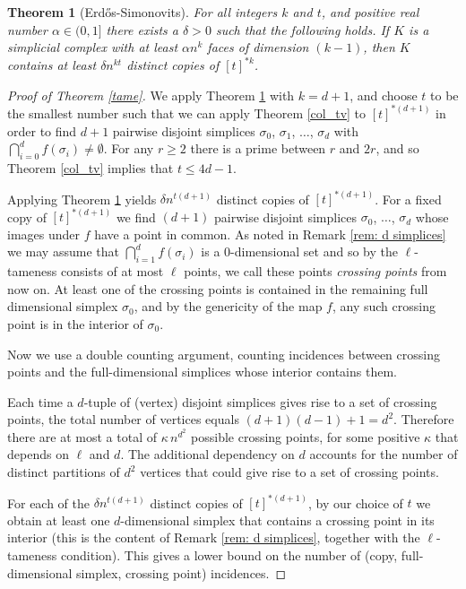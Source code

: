 \documentclass[12pt,a4paper,oneside]{amsart}\sloppy
\newtheorem{theorem}{Theorem}%
\theoremstyle{definition}
\begin{document}
\begin{theorem}[Erd\H{o}s-Simonovits]\label{ES}
For all integers $k$ and $t$, and positive real number $\alpha \in (0,1]$ there exists a $\delta>0$ such that the following holds. If $K$ is a simplicial complex with at least $\alpha n^k$ faces of dimension $(k-1)$, then $K$ contains at least $\delta n^{kt}$ distinct copies of $[t]^{*k}$.
\end{theorem}


\begin{proof}[Proof of Theorem \ref{tame}] We apply Theorem \ref{ES} with $k=d+1$, and choose $t$ to be the smallest number such that we can apply Theorem \ref{col_tv} to $[t]^{*(d+1)}$ in order to find $d+1$ pairwise disjoint simplices $\sigma_0$, $\sigma_1$, $\ldots$,  $\sigma_d$ with $\bigcap_{i=0}^{d} f(\sigma_i)\neq \emptyset$. 
For any $r\geq 2$ there is a prime between $r$ and $2r$, and so Theorem \ref{col_tv} implies that $t\leq 4d-1$.

Applying Theorem \ref{ES} yields $\delta n^{t(d+1)}$ distinct copies of $[t]^{*(d+1)}$. For a fixed copy of $[t]^{*(d+1)}$ we find $(d+1)$ pairwise disjoint simplices $\sigma_0$, $\dots$, $\sigma_{d}$ whose images under $f$ have a point in common. 
As noted in Remark \ref{rem: d simplices} we may assume that $\bigcap_{i=1}^{d} f(\sigma_i)$ is a 0-dimensional set and so by the $\ell$-tameness consists of at most $\ell$ points,  we call these points \emph{crossing points} from now on. At least one of the crossing points is contained in the remaining full dimensional simplex $\sigma_0$, and by the genericity of the map $f$, any such crossing point is in the interior of $\sigma_0$. 

Now we use a double counting argument, counting incidences between crossing points and the full-dimensional simplices whose interior contains them.

Each time a $d$-tuple of (vertex) disjoint simplices gives rise to a set of crossing points, the total number of vertices equals $(d+1)(d-1)+1 = d^2$. Therefore there are at most a total of $\kappa \, n^{d^2}$ possible crossing points, for some positive $\kappa$ that depends on $\ell$ and $d$. The additional dependency on $d$ accounts for the number of distinct partitions of $d^2$ vertices that could give rise to a set of crossing points.

For each of the $\delta n^{t(d+1)}$ distinct copies of $[t]^{*(d+1)}$, by our choice of $t$ we obtain at least one $d$-dimensional simplex that contains a crossing point in its interior (this is the content of Remark \ref{rem: d simplices}, together with the $\ell$-tameness condition). This gives a lower bound on the number of (copy, full-dimensional simplex, crossing point) incidences.


\end{proof}
\end{document}
